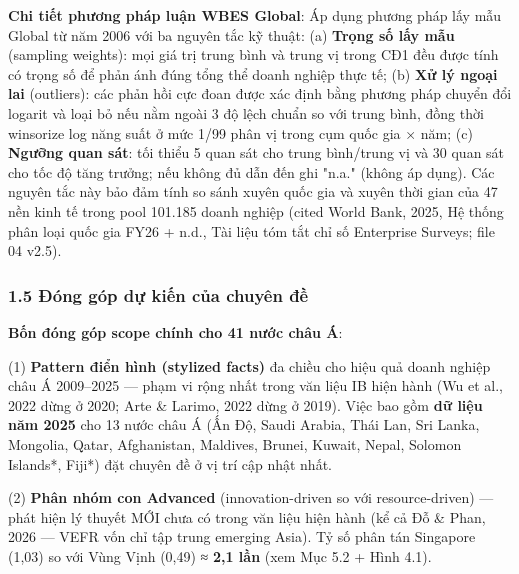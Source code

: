 \documentclass[12pt,a4paper]{article}
\begin{document}
\textbf{Chi tiết phương pháp luận WBES Global}: Áp dụng phương pháp lấy
mẫu Global từ năm 2006 với ba nguyên tắc kỹ thuật: (a) \textbf{Trọng số
lấy mẫu} (sampling weights): mọi giá trị trung bình và trung vị trong
CĐ1 đều được tính có trọng số để phản ánh đúng tổng thể doanh nghiệp
thực tế; (b) \textbf{Xử lý ngoại lai} (outliers): các phản hồi cực đoan
được xác định bằng phương pháp chuyển đổi logarit và loại bỏ nếu nằm
ngoài 3 độ lệch chuẩn so với trung bình, đồng thời winsorize log năng
suất ở mức 1/99 phân vị trong cụm quốc gia × năm; (c) \textbf{Ngưỡng
quan sát}: tối thiểu 5 quan sát cho trung bình/trung vị và 30 quan sát
cho tốc độ tăng trưởng; nếu không đủ dẫn đến ghi "n.a." (không áp dụng).
Các nguyên tắc này bảo đảm tính so sánh xuyên quốc gia và xuyên thời
gian của 47 nền kinh tế trong pool 101.185 doanh nghiệp (cited World
Bank, 2025, Hệ thống phân loại quốc gia FY26 + n.d., Tài liệu tóm tắt
chỉ số Enterprise Surveys; file 04 v2.5).

\hypertarget{15-ux111uxf3ng-guxf3p-dux1ef1-kiux1ebfn-cux1ee7a-chuyuxean-ux111ux1ec1}{%
\subsubsection{1.5 Đóng góp dự kiến của chuyên
đề}\label{15-ux111uxf3ng-guxf3p-dux1ef1-kiux1ebfn-cux1ee7a-chuyuxean-ux111ux1ec1}}

\textbf{Bốn đóng góp scope chính cho 41 nước châu Á}:

(1) \textbf{Pattern điển hình (stylized facts)} đa chiều cho hiệu quả
doanh nghiệp châu Á 2009--2025 --- phạm vi rộng nhất trong văn liệu IB
hiện hành (Wu et al., 2022 dừng ở 2020; Arte \& Larimo, 2022 dừng ở
2019). Việc bao gồm \textbf{dữ liệu năm 2025} cho 13 nước châu Á (Ấn Độ,
Saudi Arabia, Thái Lan, Sri Lanka, Mongolia, Qatar, Afghanistan,
Maldives, Brunei, Kuwait, Nepal, Solomon Islands*, Fiji*) đặt chuyên đề
ở vị trí cập nhật nhất.

(2) \textbf{Phân nhóm con Advanced} (innovation-driven so với
resource-driven) --- phát hiện lý thuyết MỚI chưa có trong văn liệu hiện
hành (kể cả Đỗ \& Phan, 2026 --- VEFR vốn chỉ tập trung emerging Asia).
Tỷ số phân tán Singapore (1,03) so với Vùng Vịnh (0,49) ≈ \textbf{2,1
lần} (xem Mục 5.2 + Hình 4.1).
\end{document}
